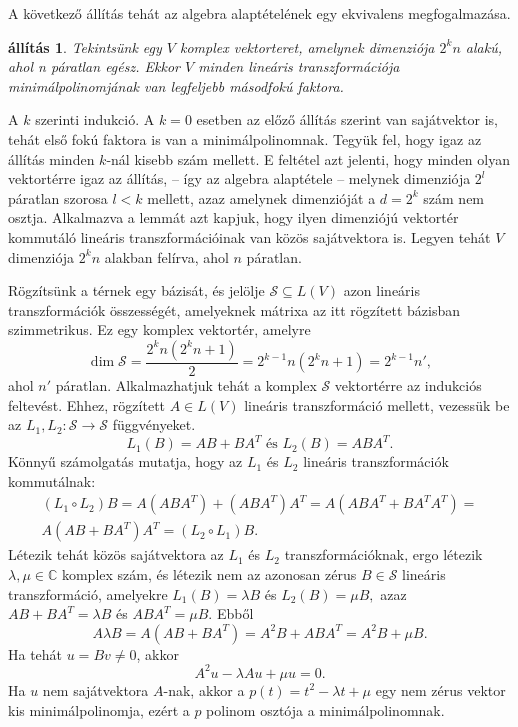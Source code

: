 \documentclass[9pt, a4paper, showtrims]{memoir}
\makeatletter
\renewenvironment{proof}[1][\proofname]
    {\par\pushQED{\qed}%
    \normalfont \topsep6\p@\@plus6\p@\relax
    \trivlist
    \item[\hskip\labelsep
        \itshape
    #1\@addpunct{:}]\ignorespaces}
    {\popQED\endtrivlist\@endpefalse}
\theoremstyle{plain}
\newtheorem{proposition}{állítás}[chapter]
\theoremstyle{remark}
\theoremstyle{definition}
\makeatother
\begin{document}
A következő állítás tehát az algebra alaptételének egy ekvivalens megfogalmazása.
\begin{proposition}
    Tekintsünk egy $V$ komplex vektorteret, amelynek dimenziója $2^kn$ alakú,
    ahol n páratlan egész.
    Ekkor $V$ minden lineáris transzformációja minimálpolinomjának 
    van legfeljebb másodfokú faktora.
\end{proposition}
\begin{proof}
    A $k$ szerinti indukció.
    A $k=0$ esetben az előző állítás szerint van sajátvektor is, 
    tehát első fokú faktora is van a minimálpolinomnak.
    Tegyük fel, hogy igaz az állítás minden $k$-nál kisebb szám mellett.
    E feltétel azt jelenti, hogy minden olyan vektortérre igaz az állítás,
    -- így az algebra alaptétele --
    melynek dimenziója $2^l$ páratlan szorosa $l<k$ mellett, 
    azaz amelynek dimenzióját a $d=2^k$ szám nem osztja.
    Alkalmazva a lemmát azt kapjuk, hogy ilyen dimenziójú vektortér kommutáló
    lineáris transzformációinak van közös sajátvektora is.
    Legyen tehát $V$ dimenziója $2^kn$ alakban felírva, ahol $n$ páratlan.

    Rögzítsünk a térnek egy bázisát, és jelölje
    \(
    \mathcal{S}\subseteq L(V)
    \)
    azon lineáris transzformációk összességét, 
    amelyeknek mátrixa az itt rögzített bázisban szimmetrikus.
    Ez egy komplex vektortér,
    amelyre
    \[
        \dim\mathcal{S}=
        \frac{2^kn\left( 2^kn+1 \right)}{2}=
        2^{k-1}n\left(2^kn+1  \right)=
        2^{k-1}n',
    \]
    ahol $n'$ páratlan.
    Alkalmazhatjuk tehát a komplex $\mathcal{S}$ vektortérre az indukciós feltevést.
    Ehhez, rögzített $A\in L\left( V \right)$ lineáris transzformáció mellett, 
    vezessük be az $L_1,L_2:\mathcal{S}\to\mathcal{S}$ függvényeket.
    \[
        L_1\left( B \right)=AB+BA^T \text{ és }
        L_2\left( B \right)=ABA^T.
    \]
    Könnyű számolgatás mutatja, hogy az $L_1$ és $L_2$ lineáris transzformációk kommutálnak:
    \begin{multline*}
        \left( L_1\circ L_2\right)B=
        A\left( ABA^T \right)+\left( ABA^T \right)A^T=
        A\left( ABA^T+BA^TA^T \right)
        =\\
        A\left( AB+BA^T \right)A^T =
        \left( L_2\circ L_1 \right)B.
    \end{multline*}
    Létezik tehát közös sajátvektora az $L_1$ és $L_2$ transzformációknak, ergo
    létezik $\lambda,\mu\in\mathbb{C}$ komplex szám, 
    és létezik nem az azonosan zérus $B\in\mathcal{S}$ lineáris transzformáció,
    amelyekre 
    $
    L_1\left( B \right)=\lambda B
    $
    és
    $
    L_2\left( B \right)=\mu B,
    $
    azaz
    $
    AB+BA^T=\lambda B
    $
    és
    $
    ABA^T=\mu B.
    $
    Ebből
    \[
        A\lambda B=
        A\left( AB+BA^T \right)=
        A^2B + ABA^T=
        A^2B + \mu B.
    \]
    Ha tehát $u=Bv\neq 0$, akkor
    \[
        A^2u-\lambda Au+\mu u=0.
    \]
    Ha $u$ nem sajátvektora $A$-nak, akkor a 
    $p\left( t \right)=t^2-\lambda t+\mu$
    egy nem zérus vektor kis minimálpolinomja, 
    ezért a $p$ polinom osztója a minimálpolinomnak.
\end{proof}
\end{document}
